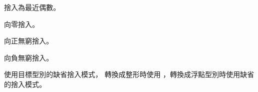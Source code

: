 \startCLOD[修飾符][捨入模式描述]

{捨入為最近偶數。}

{向零捨入。}

{向正無窮捨入。}

{向負無窮捨入。}

{使用目標型別的缺省捨入模式，
轉換成整形時使用 ，轉換成浮點型別時使用缺省的捨入模式。}

\stopCLOD

